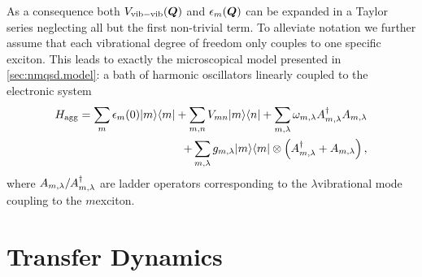 As a consequence both $V_\mathrm{vib-vib}(\boldsymbol{Q})$ and $\epsilon_m(\boldsymbol{Q})$ can be expanded in a Taylor series neglecting all but the first non-trivial term.
To alleviate notation we further assume that each vibrational degree of freedom only couples to one specific exciton.
This leads to exactly the microscopical model presented in \autoref{sec:nmqsd.model}: a bath of harmonic oscillators linearly coupled to the electronic system
\begin{align*}
  H_\mathrm{agg} =
  \sum_m \epsilon_m(0) | m \rangle\langle m | + \sum_{m,n} V_{mn} | m \rangle\langle n | + \sum_{m, \lambda} \omega_{m, \lambda} A^\dagger_{m, \lambda} A_{m, \lambda} \\
  + \sum_{m, \lambda} g_{m, \lambda} | m \rangle\langle m | \otimes \left( A^\dagger_{m, \lambda} + A_{m, \lambda} \right),
\end{align*}
where $A_{m, \lambda}/A^\dagger_{m, \lambda}$ are ladder operators corresponding to the $\lambda$\th vibrational mode coupling to the $m$\th exciton.



\section{Transfer Dynamics }
\label{sec:app.fmo}


